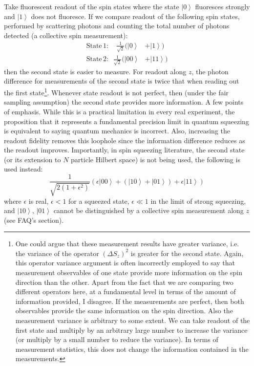\documentclass[reqno]{amsart}
\newcommand{\ket}[1]{\left| #1 \right>}
\begin{document}
Take fluorescent readout of the spin states where the state $\ket{0}$ fluoresces strongly and $\ket{1}$ does not fluoresce. If we compare readout of the following spin states, performed by scattering photons and counting the total number of photons detected (a collective spin measurement):
\begin{align*}
\mathrm{State}\,1: \quad \frac{1}{\sqrt{2}}(\ket{0}& + \ket{1})\\
\mathrm{State}\,2: \;\; \frac{1}{\sqrt{2}}(\ket{00}& + \ket{11})
\end{align*}
then the second state is easier to measure. For readout along $z$, the photon difference for measurements of the second state is twice that when reading out the first state\footnote{One could argue that these measurement results have greater variance, i.e. the variance of the operator $(\Delta S_z)^2$ is greater for the second state. Again, this operator variance argument is often incorrectly employed to say that measurement observables of one state provide more information on the spin direction than the other. Apart from the fact that we are comparing two different operators here, at a fundamental level in terms of the amount of information provided, I disagree. If the measurements are perfect, then both observables provide the same information on the spin direction. Also the measurement variance is arbitrary to some extent. We can take readout of the first state and multiply by an arbitrary large number to increase the variance (or multiply by a small number to reduce the variance). In terms of measurement statistics, this does not change the information contained in the measurements.}. Whenever state readout is not perfect, then (under the fair sampling assumption) the second state provides more information. A few points of emphasis. While this is a practical limitation in every real experiment, the proposition that it represents a fundamental precision limit in quantum squeezing is equivalent to saying quantum mechanics is incorrect. Also, increasing the readout fidelity removes this loophole since the information difference reduces as the readout improves. Importantly, in spin squeezing literature, the second state (or its extension to $N$ particle Hilbert space) is not being used, the following is used instead:
\[ \frac{1}{\sqrt{2(1+\epsilon^2)}}\left(\epsilon\ket{00} + \left(\ket{10}+\ket{01}\right) + \epsilon\ket{11}\right) \]
where $\epsilon$ is real, $\epsilon <1$ for a squeezed state, $\epsilon \ll 1$ in the limit of strong squeezing, and $\ket{10}$, $\ket{01}$ cannot be distinguished by a collective spin measurement along $z$ \cite{Kitagawa1993, Ma2011, Andre2002, Vuletic2023} (see FAQ's section).\\
\end{document}
